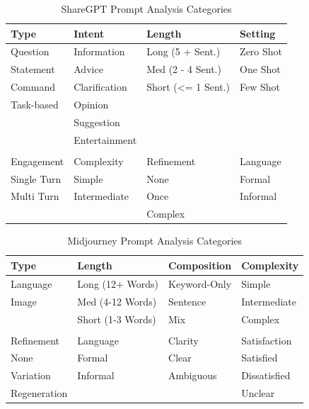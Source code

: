 \begin{table}[]
    \centering
    \caption{ShareGPT Prompt Analysis Categories}
    \begin{tabular}{@{}llll@{}}
        \toprule
        Type        & Intent        & Length             & Setting   \\ \midrule
        Question    & Information   & Long (5 + Sent.)   & Zero Shot \\
        Statement   & Advice        & Med (2 - 4 Sent.)  & One Shot  \\
        Command     & Clarification & Short (<= 1 Sent.) & Few Shot  \\
        Task-based  & Opinion       &                    &           \\
        & Suggestion    &                    &           \\
        & Entertainment &                    &           \\
        &               &                    &           \\
        \toprule
        Engagement  & Complexity    & Refinement         & Language  \\ \midrule
        Single Turn & Simple        & None               & Formal    \\
        Multi Turn  & Intermediate  & Once               & Informal  \\
        &               & Complex            &           \\ \bottomrule
    \end{tabular}
    \label{tab:sharegpt-prompt-analysis-categories}
\end{table}

\begin{table}[]
    \centering
    \caption{Midjourney Prompt Analysis Categories}
    \begin{tabular}{@{}llll@{}}
        \toprule
        Type         & Length            & Composition  & Complexity   \\ \midrule
        Language     & Long (12+ Words)  & Keyword-Only & Simple       \\
        Image        & Med (4-12 Words)  & Sentence     & Intermediate \\
        & Short (1-3 Words) & Mix          & Complex      \\
        \\
        \toprule
        Refinement          & Language & Clarity & Satisfaction \\
        \midrule
        None & Formal & Clear & Satisfied \\
        Variation          & Informal & Ambiguous & Dissatisfied \\
        Regeneration & & & Unclear \\
        \bottomrule
    \end{tabular}
    \label{tab:midjourney-prompt-analysis-categories}
\end{table}


